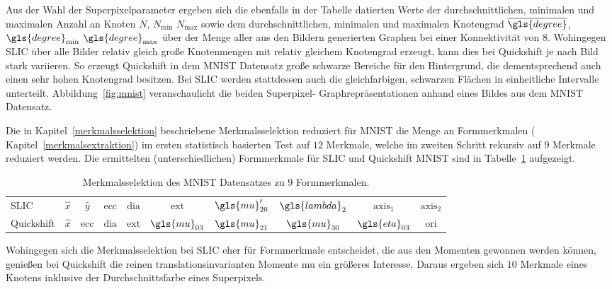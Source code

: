 Aus der Wahl der Superpixelparameter ergeben sich die ebenfalls in der Tabelle datierten Werte der durchschnittlichen, minimalen und maximalen Anzahl an Knoten $\overline{N}$, $N_{\min}$ \bzw{} $N_{\max}$ sowie dem durchschnittlichen, minimalen und maximalen Knotengrad $\overline{\gls{degree}}$, $\gls{degree}_{\min}$ \bzw{} $\gls{degree}_{\max}$ über der Menge aller aus den Bildern generierten Graphen bei einer Konnektivität von $8$.
Wohingegen \gls{SLIC} über alle Bilder relativ gleich große Knotenmengen mit relativ gleichem Knotengrad erzeugt, kann dies bei Quickshift je nach Bild stark variieren.
So erzeugt Quickshift in dem \gls{MNIST} Datensatz \bspw{} große schwarze Bereiche für den Hintergrund, die dementsprechend auch einen sehr hohen Knotengrad besitzen.
Bei \gls{SLIC} werden stattdessen auch die gleichfarbigen, schwarzen Flächen in einheitliche Intervalle unterteilt.
Abbildung~\ref{fig:mnist} veranschaulicht die beiden Superpixel- \bzw{} Graphrepräsentationen anhand eines Bildes aus dem \gls{MNIST} Datensatz.


Die in Kapitel~\ref{merkmalsselektion} beschriebene Merkmalsselektion reduziert für \gls{MNIST} die Menge an Formmerkmalen (\vgl{} Kapitel~\ref{merkmalsextraktion}) im ersten statistisch basierten Test auf $12$ Merkmale, welche im zweiten Schritt rekursiv auf $9$ Merkmale reduziert werden.
Die ermittelten (unterschiedlichen) Formmerkmale für \gls{SLIC} und Quickshift \bzgl{} \gls{MNIST} sind in Tabelle~\ref{tab:mnist_merkmale} aufgezeigt.
\begin{table}[t]
\centering
\begin{tabular}{lccccccccc}
  \toprule
  \gls{SLIC} & $\hat{x}$ & $\hat{y}$ & $\mathrm{ecc}$ & $\mathrm{dia}$ & $\mathrm{ext}$ & $\gls{mu}^{\prime}_{20}$ & $\gls{lambda}_2$ & $\mathrm{axis}_1$ & $\mathrm{axis}_2$\\
  Quickshift & $\hat{x}$ & $\mathrm{ecc}$ & $\mathrm{dia}$ & $\mathrm{ext}$ & $\gls{mu}_{03}$ & $\gls{mu}_{21}$ & $\gls{mu}_{30}$ & $\gls{eta}_{03}$ & $\mathrm{ori}$\\
  \bottomrule
\end{tabular}
  \caption[\gls{MNIST} Merkmalsselektion]{Merkmalsselektion des \gls{MNIST} Datensatzes zu $9$ Formmerkmalen.}
\label{tab:mnist_merkmale}
\end{table}
Wohingegen sich die Merkmalsselektion bei \gls{SLIC} eher für Formmerkmale entscheidet, die aus den Momenten gewonnen werden können, genießen bei Quickshift die reinen translationsinvarianten Momente \gls{mu} ein größeres Interesse.
Daraus ergeben sich $10$ Merkmale eines Knotens inklusive der Durchschnittsfarbe eines Superpixels.

